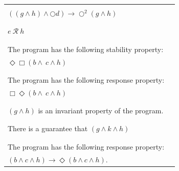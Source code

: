 \documentclass[12pt]{article}
\begin{document}
\begin{enumerate}
\begin{table}
\begin{tabular}{|l|l|}
\hline

&\\
		
$ ((g \wedge h) \wedge \bigcirc d) \rightarrow \bigcirc^{2} (g \wedge h)$  &\\

&\\

\hline

&\\
		
$e ~\mathcal{R}~ h$									 &\\

&\\

\hline

&\\
		
The program has the following stability property: &\\
$\Diamond \Box (b \wedge \ c \wedge h)$		 &\\

&\\

\hline

&\\
		
The program has the following response property: &\\
$\Box \Diamond (b \wedge \ c \wedge h)$		 &\\

&\\

\hline

&\\
		
$( g \wedge h)$ is an invariant property of the program.  &\\

&\\

\hline

&\\
		
There is a guarantee that $(g \wedge k \wedge h)$	 &\\

&\\

\hline

&\\
		
The program has the following response property: &\\
$(b \wedge c \wedge h) \rightarrow \Diamond (b \wedge c \wedge h)$.   &\\


\end{tabular}
\end{table}
\end{enumerate}
\end{document}
